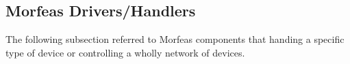 \subsection{Morfeas Drivers/Handlers}
The following subsection referred to Morfeas components that handing a specific type of device or controlling a wholly network of devices.




